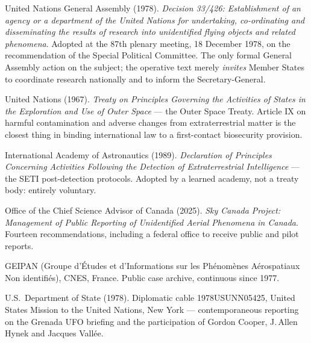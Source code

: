 \begin{list}{}{\setlength{\leftmargin}{1.2em}\setlength{\itemindent}{-1.2em}
\setlength{\itemsep}{3pt}}
\item United Nations General Assembly (1978). \emph{Decision 33/426: Establishment of an agency or
a department of the United Nations for undertaking, co-ordinating and disseminating the results of
research into unidentified flying objects and related phenomena}. Adopted at the 87th plenary
meeting, 18 December 1978, on the recommendation of the Special Political Committee. The only formal
General Assembly action on the subject; the operative text merely \emph{invites} Member States to
coordinate research nationally and to inform the Secretary-General.
\item United Nations (1967). \emph{Treaty on Principles Governing the Activities of States in the
Exploration and Use of Outer Space} --- the Outer Space Treaty. Article IX on harmful contamination
and adverse changes from extraterrestrial matter is the closest thing in binding international law
to a first-contact biosecurity provision.
\item International Academy of Astronautics (1989). \emph{Declaration of Principles Concerning
Activities Following the Detection of Extraterrestrial Intelligence} --- the SETI post-detection
protocols. Adopted by a learned academy, not a treaty body: entirely voluntary.
\item Office of the Chief Science Advisor of Canada (2025). \emph{Sky Canada Project: Management of
Public Reporting of Unidentified Aerial Phenomena in Canada}. Fourteen recommendations, including a
federal office to receive public and pilot reports.
\item GEIPAN (Groupe d'\'Etudes et d'Informations sur les Ph\'enom\`enes A\'erospatiaux Non
identifi\'es), CNES, France. Public case archive, continuous since 1977.
\item U.S.\ Department of State (1978). Diplomatic cable 1978USUNN05425, United States Mission to
the United Nations, New York --- contemporaneous reporting on the Grenada UFO briefing and the
participation of Gordon Cooper, J.\,Allen Hynek and Jacques Vall\'ee.
\end{list}


